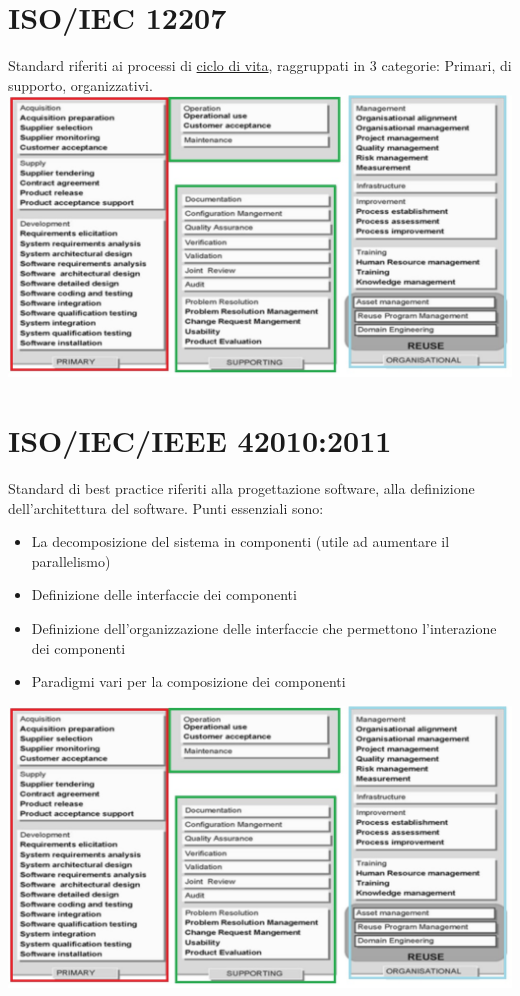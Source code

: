 \documentclass[11pt]{article}
\begin{document}
	\section{\LARGE ISO/IEC 12207}
	\label{sec:iso12207}
	Standard riferiti ai processi di \hyperref[sec:ciclodivita]{ciclo di vita}, raggruppati in 3 categorie: Primari, di supporto, organizzativi.
	\linebreak
	\includegraphics[scale=0.5]{iso12250.jpg}

	\section{\LARGE ISO/IEC/IEEE 42010:2011}
	\label{sec:iso12207}
	Standard di best practice riferiti alla progettazione software, alla definizione dell'architettura del software. Punti essenziali sono:
	\begin{itemize}  
	\item La decomposizione del sistema in componenti (utile ad aumentare il parallelismo)
	\item Definizione delle interfaccie dei componenti 
	\item Definizione dell'organizzazione delle interfaccie che permettono l'interazione dei componenti
	\item Paradigmi vari per la composizione dei componenti 
	\end{itemize}	
	
	\includegraphics[scale=0.5]{iso12250.jpg}	
\end{document}

